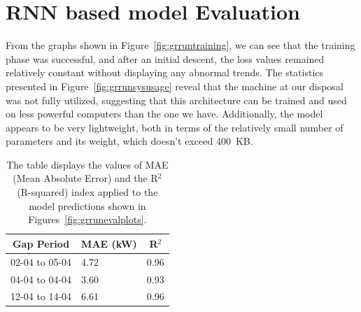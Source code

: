 
\section{RNN based model Evaluation}
From the graphs shown in Figure~\ref{fig:grruntraining},
we can see that the training phase was successful,
and after an initial descent, the loss values remained relatively
constant without displaying any abnormal trends.
The statistics presented in Figure~\ref{fig:grrunsysusage} reveal
that the machine at our disposal was not fully utilized,
suggesting that this architecture can be trained and used on
less powerful computers than the one we have.
Additionally, the model appears to be very lightweight, both in terms
of the relatively small number of parameters and its weight,
which doesn't exceed 400~KB.


\begin{table}[H]
	\begin{center}
		\begin{tabular}[c]{l|l|l}
			\multicolumn{1}{c|}{\textbf{Gap Period}} &
			\multicolumn{1}{c|}{\textbf{MAE (kW)}}   &
			\multicolumn{1}{c}{\textbf{R}$^2$}                     \\
			\hline

			02-04 to 05-04                           & 4.72 & 0.96 \\
			04-04 to 04-04                           & 3.60 & 0.93 \\
			12-04 to 14-04                           & 6.61 & 0.96
		\end{tabular}
	\end{center}
	\caption{The table displays the values of MAE (Mean Absolute Error) and the R$^2$ (R-squared) index applied to the model predictions shown in Figures~\ref{fig:grrunevalplots}.}\label{tab:grrunpmaer}
\end{table}

